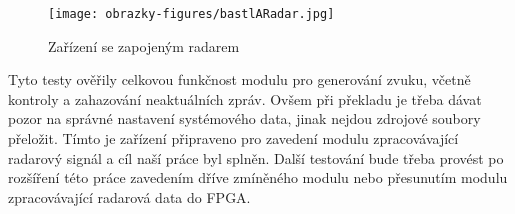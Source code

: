 	\begin{figure}[H]
		\begin{center}
			\texttt{[image: obrazky-figures/bastlARadar.jpg]}
			\caption{Zařízení se zapojeným radarem}
			\label{testovani::radar}
		\end{center}
	\end{figure}
	
	Tyto testy ověřily celkovou funkčnost modulu pro generování zvuku, včetně kontroly a zahazování neaktuálních zpráv. Ovšem při překladu je třeba dávat pozor na správné nastavení systémového data, jinak nejdou zdrojové soubory přeložit.
	Tímto je zařízení připraveno pro zavedení modulu zpracovávající radarový signál a cíl naší práce byl splněn. Další testování bude třeba provést po rozšíření této práce zavedením dříve zmíněného modulu nebo přesunutím modulu zpracovávající radarová data do FPGA.
	
